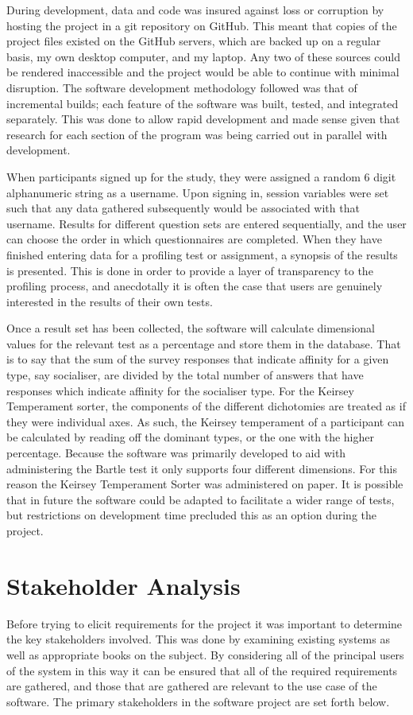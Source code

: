 \documentclass[12pt,a4paper,twoside]{report}
\begin{document}
During development, data and code was insured against loss or corruption by hosting the project in a git repository on GitHub. This meant that copies of the project files existed on the GitHub servers, which are backed up on a regular basis, my own desktop computer, and my laptop. Any two of these sources could be rendered inaccessible and the project would be able to continue with minimal disruption. The software development methodology followed was that of incremental builds; each feature of the software was built, tested, and integrated separately. This was done to allow rapid development and made sense given that research for each section of the program was being carried out in parallel with development.

When participants signed up for the study, they were assigned a random 6 digit alphanumeric string as a username. Upon signing in, session variables were set such that any data gathered subsequently would be associated with that username. Results for different question sets are entered sequentially, and the user can choose the order in which questionnaires are completed. When they have finished entering data for a profiling test or assignment, a synopsis of the results is presented. This is done in order to provide a layer of transparency to the profiling process, and anecdotally it is often the case that users are genuinely interested in the results of their own tests.

Once a result set has been collected, the software will calculate dimensional values for the relevant test as a percentage and store them in the database. That is to say that the sum of the survey responses that indicate affinity for a given type, say socialiser, are divided by the total number of answers that have responses which indicate affinity for the socialiser type. For the Keirsey Temperament sorter, the components of the different dichotomies are treated as if they were individual axes. As such, the Keirsey temperament of a participant can be calculated by reading off the dominant types, or the one with the higher percentage. Because the software was primarily developed to aid with administering the Bartle test it only supports four different dimensions. For this reason the Keirsey Temperament Sorter was administered on paper. It is possible that in future the software could be adapted to facilitate a wider range of tests, but restrictions on development time precluded this as an option during the project.

\section{Stakeholder Analysis}
Before trying to elicit requirements for the project it was important to determine the key stakeholders involved. This was done by examining existing systems as well as appropriate books on the subject. By considering all of the principal users of the system in this way it can be ensured that all of the required requirements are gathered, and those that are gathered are relevant to the use case of the software. The primary stakeholders in the software project are set forth below.
\end{document}
